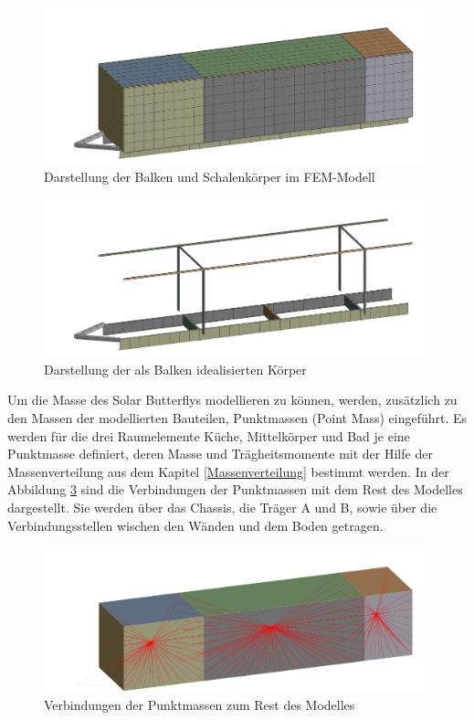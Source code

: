 \begin{figure}[H]
  \centering
  \centering
  \includegraphics[width=.8\linewidth]{04_figures/FEM Mesh1.png}
  \caption{Darstellung der Balken und Schalenkörper im FEM-Modell}
  \label{FEM Mesh1}
\end{figure}
\begin{figure}[H]
  \centering
  \includegraphics[width=.8\linewidth]{04_figures/FEM Mesh3.png}
  \caption{Darstellung der als Balken idealisierten Körper}
  \label{FEM Mesh3}
\end{figure}

Um die Masse des Solar Butterflys modellieren zu können, werden, zusätzlich zu den Massen der modellierten Bauteilen, Punktmassen (Point Mass) eingeführt. Es werden für die drei Raumelemente Küche, Mittelkörper und Bad je eine Punktmasse definiert, deren Masse und Trägheitsmomente mit der Hilfe der Massenverteilung aus dem Kapitel \ref{Massenverteilung} bestimmt werden. In der Abbildung \ref{img:FEM Punktmasse} sind die Verbindungen der Punktmassen mit dem Rest des Modelles dargestellt. Sie werden über das Chassis, die Träger A und B, sowie über die Verbindungsstellen wischen den Wänden und dem Boden getragen.\\
\begin{figure}[H]
  \centering
  \includegraphics[width=0.8\linewidth]{04_Figures/FEM Punktmasse.png}
  \caption{Verbindungen der Punktmassen zum Rest des Modelles}
  \label{img:FEM Punktmasse}
\end{figure}


